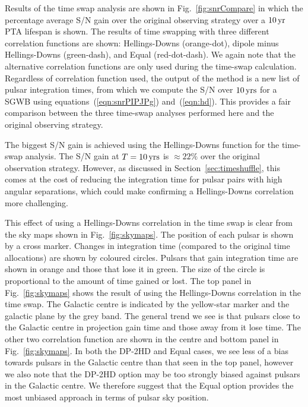 \documentclass[fleqn,usenatbib]{mnras}
\begin{document}
Results of the time swap analysis are shown in Fig.~\ref{fig:snrCompare} in which the percentage average S/N gain over the original observing strategy over a $10\,{\rm yr}$ PTA lifespan is shown. 
The results of time swapping with three different correlation functions are shown: Hellings-Downs (orange-dot), dipole minus Hellings-Downs (green-dash), and Equal (red-dot-dash).
We again note that the alternative correlation functions are only used during the time-swap calculation. 
Regardless of correlation function used, the output of the method is a new list of pulsar integration times, from which we compute the S/N over $10\,{\rm yrs}$ for a SGWB using equations~(\ref{eqn:snrPIPJPg}) and~(\ref{eqn:hd}).
This provides a fair comparison between the three time-swap analyses performed here and the original observing strategy.


The biggest S/N gain is achieved using the Hellings-Downs function for the time-swap analysis. 
The S/N gain at $T=10\,{\rm yrs}$ is $\approx 22\%$ over the original observation strategy.
However, as discussed in Section~\ref{sec:timeshuffle}, this comes at the cost of reducing the integration time for pulsar pairs with high angular separations, which could make confirming a Hellings-Downs correlation more challenging. 

This effect of using a Hellings-Downs correlation in the time swap is clear from the sky maps shown in Fig.~\ref{fig:skymaps}. 
The position of each pulsar is shown by a cross marker. 
Changes in integration time (compared to the original time allocations) are shown by coloured circles. 
Pulsars that gain integration time are shown in orange and those that lose it in green. 
The size of the circle is proportional to the amount of time gained or lost. 
The top panel in Fig.~\ref{fig:skymaps} shows the result of using the Hellings-Downs correlation in the time swap. 
The Galactic centre is indicated by the yellow-star marker and the galactic plane by the grey band. 
The general trend we see is that pulsars close to the Galactic centre in projection gain time and those away from it lose time. 
The other two correlation function are shown in the centre and bottom panel in Fig.~\ref{fig:skymaps}. 
In both the DP-2HD and Equal cases, we see less of a bias towards pulsars in the Galactic centre than that seen in the top panel, however we also note that the DP-2HD option may be too strongly biased against pulsars in the Galactic centre.
We therefore suggest that the Equal option provides the most unbiased approach in terms of pulsar sky position. 
\end{document}
